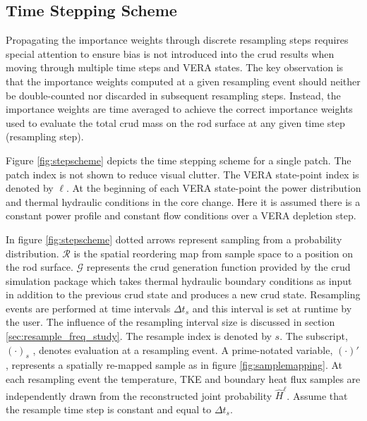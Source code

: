 \subsection{Time Stepping Scheme}
\label{sec:time_step_scheme}

Propagating the importance weights through discrete resampling steps requires special attention to ensure bias is not introduced into the crud results when moving through multiple time steps and VERA states.  The key observation is that the importance weights computed at a given resampling event should neither be double-counted nor discarded in subsequent resampling steps.  Instead, the importance weights are time averaged to achieve the correct importance weights used to evaluate the total crud mass on the rod surface at any given time step (resampling step).

Figure \ref{fig:stepscheme} depicts the time stepping scheme for a single patch. The patch index is not shown to reduce visual clutter. The VERA state-point index is denoted by $\ell$.  At the beginning of each VERA state-point the power distribution and thermal hydraulic conditions in the core change.  Here it is assumed there is a constant power profile and constant flow conditions over a VERA depletion step.

In figure \ref{fig:stepscheme} dotted arrows represent sampling from a probability distribution.  $\mathcal R$ is the spatial reordering map from sample space to a position on the rod surface. $\mathcal G$ represents the crud generation function provided by the crud simulation package which takes thermal hydraulic boundary conditions as input in addition to the previous crud state and produces a new crud state.  Resampling events are performed at time intervals $\Delta t_s$ and this interval is set at runtime by the user.  The influence of the resampling interval size is discussed in section \ref{sec:resample_freq_study}.  The resample index is denoted by $s$.  The subscript, $(\cdot)_s$ , denotes evaluation at a resampling event.  A prime-notated variable,  $(\cdot)'$, represents a spatially re-mapped sample as in figure \ref{fig:samplemapping}.  At each resampling event the temperature, TKE and boundary heat flux samples are independently drawn from the reconstructed joint probability $\hat H^\ell$.  Assume that the resample time step is constant and equal to $\Delta t_s$.


